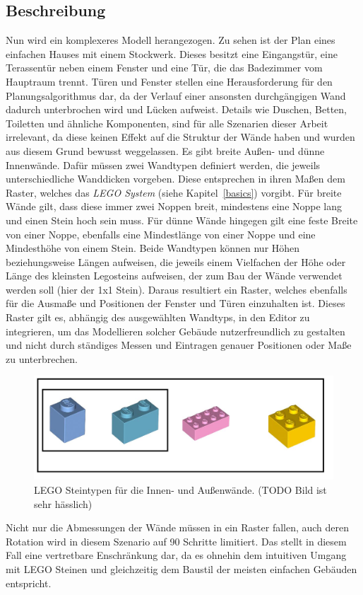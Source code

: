 \subsection*{Beschreibung}
Nun wird ein komplexeres Modell herangezogen.
Zu sehen ist der Plan eines einfachen Hauses mit einem Stockwerk.
Dieses besitzt eine Eingangstür, eine Terassentür neben einem Fenster und eine Tür, die das Badezimmer vom Hauptraum trennt.
Türen und Fenster stellen eine Herausforderung für den Planungsalgorithmus dar, da der Verlauf einer ansonsten durchgängigen Wand dadurch unterbrochen wird und Lücken aufweist.
Details wie Duschen, Betten, Toiletten und ähnliche Komponenten, sind für alle Szenarien dieser Arbeit irrelevant, da diese keinen Effekt auf die Struktur der Wände haben und wurden aus diesem Grund bewusst weggelassen.
Es gibt breite Außen- und dünne Innenwände.
Dafür müssen zwei Wandtypen definiert werden, die jeweils unterschiedliche Wanddicken vorgeben.
Diese entsprechen in ihren Maßen dem Raster, welches das \textit{LEGO System} (siehe Kapitel~\ref{basics}) vorgibt.
Für breite Wände gilt, dass diese immer zwei Noppen breit, mindestens eine Noppe lang und einen Stein hoch sein muss.
Für dünne Wände hingegen gilt eine feste Breite von einer Noppe, ebenfalls eine Mindestlänge von einer Noppe und eine Mindesthöhe von einem Stein.
Beide Wandtypen können nur Höhen beziehungsweise Längen aufweisen, die jeweils einem Vielfachen der Höhe oder Länge des kleinsten Legosteins aufweisen, der zum Bau der Wände verwendet werden soll (hier der 1x1 Stein).
Daraus resultiert ein Raster, welches ebenfalls für die Ausmaße und Positionen der Fenster und Türen einzuhalten ist.
Dieses Raster gilt es, abhängig des ausgewählten Wandtyps, in den Editor zu integrieren, um das Modellieren solcher Gebäude nutzerfreundlich zu gestalten und nicht durch ständiges Messen und Eintragen genauer Positionen oder Maße zu unterbrechen.
\begin{figure}[!ht]
  \centering
  \includegraphics[width=0.6\columnwidth]{fig/scenario1_lego_set.png}
  \caption{LEGO Steintypen für die Innen- und Außenwände. (TODO Bild ist sehr hässlich)}
  \label{fig:Scenario1 Lego Set}
\end{figure}
Nicht nur die Abmessungen der Wände müssen in ein Raster fallen, auch deren Rotation wird in diesem Szenario auf 90\textdegree{} Schritte limitiert. 
Das stellt in diesem Fall eine vertretbare Enschränkung dar, da es ohnehin dem intuitiven Umgang mit LEGO Steinen und gleichzeitig dem Baustil der meisten einfachen Gebäuden entspricht.
